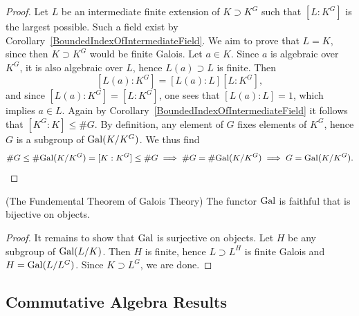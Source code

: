 \begin{proof}
    Let $L$ be an intermediate finite extension of $K\supset K^G$ such that 
    $[L : K^G]$ is the largest possible. Such a field exist by Corollary~\ref{BoundedIndexOfIntermediateField}. We aim to prove that $L=K$, since then $K\supset K^G$ would be finite Galois. Let $a\in K$. Since $a$ is algebraic over $K^G$, it is also algebraic over $L$, hence $L(a)\supset L$ is finite. Then 
    $$
        [L(a):K^G]=[L(a):L][L:K^G],
    $$
    and since $[L(a):K^G]=[L:K^G]$, one sees that $[L(a):L]=1$, which implies $a\in L$. Again by Corollary~\ref{BoundedIndexOfIntermediateField} it follows that $[K^G : K] \leq \# G$. By definition, any element of $G$ fixes elements of $K^G$, hence $G$ is a subgroup of $\mathrm{Gal}(K/K^G)$. We thus find 
    $$
        \# G \leq \#\mathrm{Gal}(K/K^G) = [K : K^G] \leq \#G \implies \#G = \#\mathrm{Gal}(K/K^G) \implies G= \mathrm{Gal}(K/K^G).
    $$  
\end{proof}
\begin{theorem}(The Fundemental Theorem of Galois Theory)
    The functor $\mathrm{Gal}$ is faithful that is bijective on objects. 
\end{theorem}
\begin{proof}
    It remains to show that $\mathrm{Gal}$ is surjective on objects. Let $H$ be any subgroup of $\mathrm{Gal}(L/K)$. Then $H$ is finite, hence $L\supset L^H$ is finite Galois and $H = \mathrm{Gal}(L/L^G)$. Since $K\supset L^G$, we are done. 
\end{proof}
\subsection{Commutative Algebra Results}
